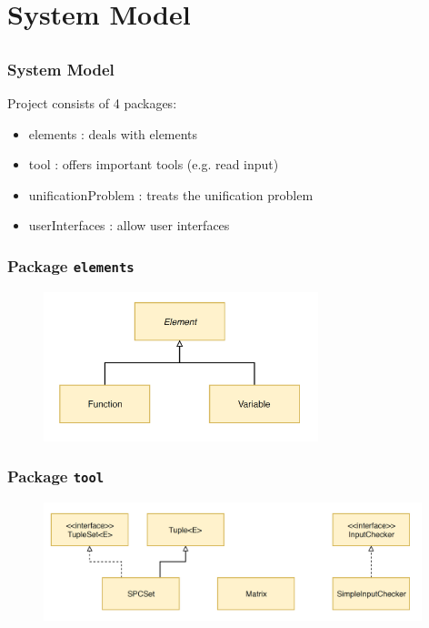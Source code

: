 \section{System Model} \subsection{}
	
	\begin{frame}[fragile=singleslide]
	\frametitle{System Model}
	 
	Project consists of 4 packages:
		\begin{itemize}
			\item elements : deals with elements
			\item tool : offers important tools (e.g. read input)
			\item unificationProblem : treats the unification problem
			\item userInterfaces : allow user interfaces
		\end{itemize}
	
  \end{frame}	
		

	\begin{frame}[fragile=singleslide]
	\frametitle{Package \texttt{elements}}
	
	\begin{figure}
		\centering
			\includegraphics[width=8cm]{Bilder/elements.PNG}
		\label{fig:elements}
	\end{figure}
	
  \end{frame}	


	\begin{frame}[fragile=singleslide]
	\frametitle{Package \texttt{tool}}
	 
	\begin{figure}
		\centering
			\includegraphics[width=11cm]{Bilder/tool.PNG}
		\label{fig:tool}
	\end{figure}
	
  \end{frame}	

